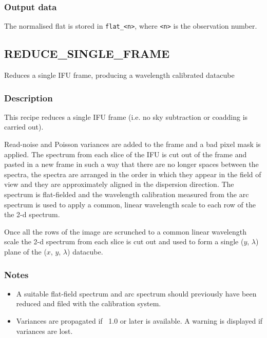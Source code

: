\documentclass[twoside,11pt,nolof]{starlink}
\providecommand{\KAPPA}{\xref{{\sc{Kappa}}}{sun95}{}}
\begin{document}
\subsubsection*{Output data}

The normalised flat is stored in \texttt{flat\_<n>}, where \texttt{<n>} is
the observation number.

\clearpage

\subsection{REDUCE\_SINGLE\_FRAME}



Reduces a single IFU frame, producing a wavelength calibrated datacube

\subsubsection*{Description}

This recipe reduces a single IFU frame (i.e. no sky subtraction or
coadding is carried out).



Read-noise and Poisson variances are added to the frame and a bad
pixel mask is applied. The spectrum from each slice of the IFU is cut
out of the frame and pasted in a new frame in such a way that there
are no longer spaces between the spectra, the spectra are arranged in
the order in which they appear in the field of view and they are
approximately aligned in the dispersion direction. The spectrum is
flat-fielded and the wavelength calibration measured from the arc
spectrum is used to apply a common, linear wavelength scale to each
row of the the 2-d spectrum.



Once all the rows of the image are scrunched to a common linear wavelength
scale the 2-d spectrum from each slice is cut out and used to form
a single ($y$, $\lambda$) plane of the ($x$, $y$, $\lambda$) datacube.

\subsubsection*{Notes}

\begin{itemize}
\item

  A suitable flat-field spectrum and arc spectrum should previously
  have been reduced and filed with the calibration system.

\item

Variances are propagated if \KAPPA\ 1.0 or later is available. A warning
is displayed if variances are lost.
\end{itemize}
\end{document}
